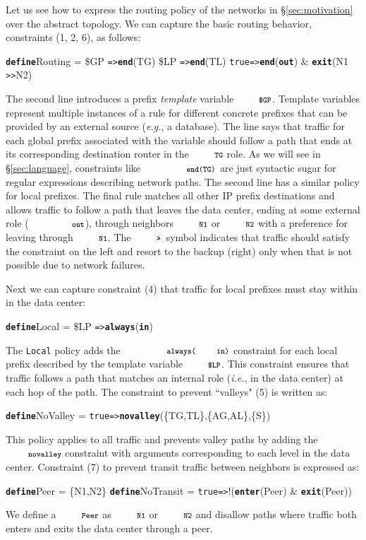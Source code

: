 \documentclass[numbers, 10pt]{sigplanconf}
\newcommand{\EG}{\emph{e.g.}}
\newcommand{\IE}{\emph{i.e.}}
\newcommand{\CD}[1]{\texttt{\small #1}}
\newcommand{\KW}[1]{\texttt{\small\bfseries{#1}}}
\newcommand{\True}{\CD{true}}
\newcommand{\Define}{\KW{define}}
\newcommand{\Prefer}{\texttt{>>}}
\newcommand{\Path}{\texttt{=>}}
\newcommand{\In}{\KW{in}}
\newcommand{\Out}{\KW{out}}
\newcommand{\Exit}{\KW{exit}}
\newcommand{\End}{\KW{end}}
\newcommand{\Enter}{\KW{enter}}
\newcommand{\Always}{\KW{always}}
\newcommand{\Novalley}{\KW{novalley}}
\begin{document}
Let us see how to express the routing policy of the networks in \S\ref{sec:motivation} over the abstract topology. We can capture the basic routing behavior, constraints (1, 2, 6),  as follows:
%
\begin{code}
\Define Routing =
    \$GP  \Path \End(TG)
    \$LP  \Path \End(TL)
    \True \Path \End(\Out) & \Exit(N1 \Prefer N2)
\end{code}
\noindent%

The second line introduces a prefix \emph{template} variable $\CD{\$GP}$. Template variables represent multiple instances of a rule for different concrete prefixes that can be provided by an external source (\EG, a database). The line says that traffic for each global prefix associated with the variable should follow a path that ends at its corresponding destination router in the $\CD{TG}$ role. As we will see in \S\ref{sec:language}, constraints like $\CD{\End(TG)}$ are just syntactic sugar for regular expressions describing network paths. The second line has a similar policy for local prefixes.
%
The final rule matches all other IP prefix destinations and allows traffic to follow a path that leaves the data center, ending at some external role ($\CD{\Out}$), through neighbors $\CD{N1}$ or $\CD{N2}$ with a preference for leaving through $\CD{N1}$. The $\CD{\Prefer}$~symbol indicates that traffic should satisfy the constraint on the left and resort to the backup (right) only when that is not possible due to network failures.%

Next we can capture constraint (4) that traffic for local prefixes must stay within in the data center:
%
\begin{code}
\Define Local =
    \$LP \Path \Always(\In)
\end{code}
\noindent%
%
The \CD{Local} policy adds the $\CD{\Always(\In)}$ constraint for each local prefix described by the template variable $\CD{\$LP}$. This constraint ensures that traffic follows a path that matches an internal role (\IE, in the data center) at each hop of the path.
%
The constraint to prevent ``valleys" (5) is written as:
%
\begin{code}
\Define NoValley =
    \True \Path \Novalley(\{TG,TL\},\{AG,AL\},\{S\})
\end{code}
\noindent%
%
This policy applies to all traffic and prevents valley paths by adding the $\Novalley$ constraint with arguments corresponding to each level in the data center.
%
Constraint (7) to prevent transit traffic between neighbors is expressed as:
%
\begin{code}
\Define Peer = \{N1,N2\}
\Define NoTransit =
    \True \Path !(\Enter(Peer) & \Exit(Peer))
\end{code}
\noindent%
%
We define a $\CD{Peer}$ as $\CD{N1}$ or $\CD{N2}$ and disallow paths where traffic both enters and exits the data center through a peer.
\end{document}
